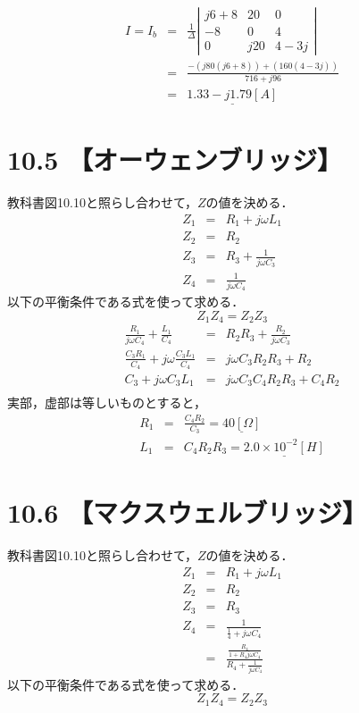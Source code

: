 \documentclass[a4j, titlepage, dvipdfmx]{jarticle}
\begin{document}
\begin{eqnarray}
    I = I_b &=& \frac{1}{\Delta}
\left|
    \begin{array}{ccc}
    j6+8 & 20 & 0 \\
    -8 & 0 & 4  \\
    0 & j20 & 4-3j
  \end{array}
\right| \\
&=& \frac{-(j80(j6+8))+(160(4-3j))}{716+j96}\\
&=& \underline{1.33-j1.79[A]}
\end{eqnarray}
\newpage

\section*{10.5 【オーウェンブリッジ】}
教科書図10.10と照らし合わせて，$Z$の値を決める．
\begin{eqnarray}
    Z_1 &=& R_1 + j\omega L_1\\
    Z_2 &=& R_2 \\
    Z_3 &=& R_3 + \frac{1}{j\omega C_3} \\
    Z_4 &=& \frac{1}{j\omega C_4}
\end{eqnarray}
以下の平衡条件である式を使って求める．
\begin{equation}
    Z_1Z_4 = Z_2Z_3
\end{equation}
\begin{eqnarray}
    \frac{R_1}{j\omega C_4} + \frac{L_1}{C_4} &=& R_2R_3 + \frac{R_2}{j\omega C_3}\\
    \frac{C_3R_1}{C_4}+ j\omega \frac{C_3L_1}{C_4} &=& j\omega C_3 R_2R_3+R_2\\
    C_3 + j\omega C_3 L_1 &=& j\omega C_3 C_4 R_2 R_3 + C_4 R_2 \\
\end{eqnarray}
実部，虚部は等しいものとすると，
\begin{eqnarray}
    R_1 &=& \frac{C_4R_2}{C_3} = \underline{40[\Omega]}\\
    L_1 &=& C_4R_2R_3 = \underline{2.0 \times 10^{-2} [H]}
\end{eqnarray}
\newpage

\section*{10.6 【マクスウェルブリッジ】}
教科書図10.10と照らし合わせて，$Z$の値を決める．
\begin{eqnarray}
    Z_1 &=& R_1 + j\omega L_1\\
    Z_2 &=& R_2 \\
    Z_3 &=& R_3  \\
    Z_4 &=& \frac{1}{\frac{1}{4} + j\omega C_4}\\
    &=& \frac{\frac{R_4}{1+R_4j\omega C_4}}{R_4 + \frac{1}{j\omega C_4}}
\end{eqnarray}
以下の平衡条件である式を使って求める．
\begin{equation}
    Z_1Z_4 = Z_2Z_3
\end{equation}
\end{document}
